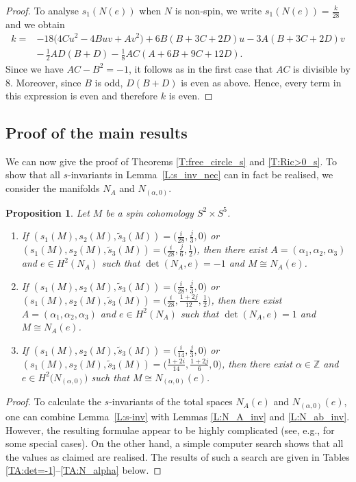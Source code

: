 \documentclass[10pt,a4paper]{amsart}
\numberwithin{equation}{section}
\newtheorem{Proposition}[Theorem]{Proposition}
\theoremstyle{definition}
\numberwithin{table}{section}
\newcommand{\Z}{\mathbb{Z}}
\begin{document}
\begin{proof}
	To analyse $s_1(N(e))$ when $N$ is non-spin, we write $s_1(N(e))=\frac{k}{28}$ and we obtain
	\begin{align*}
		k={}&{-}18\bigl(4Cu^2-4Buv+Av^2\bigr)+6B(B+3C+2D)u-3A(B+3C+2D)v\\
		&{-}\,\frac{1}{2}AD(B+D)-\frac{1}{8}AC(A+6B+9C+12D).
	\end{align*}
	Since we have $AC-B^2=-1$, it follows as in the first case that $AC$ is divisible by $8$. Moreover, since $B$ is odd, $D(B+D)$ is even as above. Hence, every term in this expression is even and therefore $k$ is even.		
\end{proof}

\subsection{Proof of the main results}

We can now give the proof of Theorems \ref{T:free_circle_s} and \ref{T:Ric>0_s}. To show that all $s$-invariants in Lemma~\ref{L:s_inv_nec} can in fact be realised, we consider the manifolds $N_A$ and $N_{(\alpha,0)}$.
\begin{Proposition}\label{P:s_inv_real}
	Let $M$ be a spin cohomology $S^2\times S^5$.
	\begin{enumerate}\itemsep=0pt
		\item[$(1)$] If $(s_1(M),s_2(M),\tilde{s}_3(M))=\bigl(\tfrac{i}{28},\tfrac{j}{3},0\bigr)$ or
        $(s_1(M),s_2(M),\tilde{s}_3(M))=\bigl(\tfrac{i}{28},\tfrac{j}{6},\tfrac{1}{2}\bigr)$,
		then there exist $A=(\alpha_1,\alpha_2,\alpha_3)$ and $e\in H^2(N_A)$ such that $\det(N_A,e)=-1$ and ${M\cong N_A(e)}$.
		\item[$(2)$] If
$(s_1(M),s_2(M),\tilde{s}_3(M))=\bigl(\tfrac{i}{28},\tfrac{j}{3},0\bigr)$ or $(s_1(M),s_2(M),\tilde{s}_3(M))=\bigl(\tfrac{i}{28},\tfrac{1+2j}{12},\tfrac{1}{2}\bigr)$,
		then there exist $A=(\alpha_1,\alpha_2,\alpha_3)$ and $e\in H^2(N_A)$ such that $\det(N_A,e)=1$ and ${M\cong N_A(e)}$.
		\item[$(3)$] If
$(s_1(M),s_2(M),\tilde{s}_3(M))=\bigl(\tfrac{i}{14},\tfrac{j}{3},0\bigr)$ or
        $(s_1(M),s_2(M),\tilde{s}_3(M))=\bigl(\tfrac{1+2i}{14},\tfrac{1+2j}{6},0\bigr)$,
then there exist $\alpha\in\Z$ and $e\in H^2\bigl(N_{(\alpha,0)}\bigr)$ such that $M\cong N_{(\alpha,0)}(e)$.
	\end{enumerate}
\end{Proposition}
\begin{proof}
	To calculate the $s$-invariants of the total spaces $N_A(e)$ and $N_{(\alpha,0)}(e)$, one can combine Lemma~\ref{L:s-inv} with Lemmas \ref{L:N_A_inv} and \ref{L:N_ab_inv}. However, the resulting formulae appear to be highly complicated (see, e.g., \cite[Propositions 5.2 and 7.11]{EZ14} for some special cases). On the other hand, a simple computer search shows that all the values as claimed are realised. The results of such a search are given in Tables \ref{TA:det=-1}--\ref{TA:N_alpha} below.
\end{proof}
\end{document}

